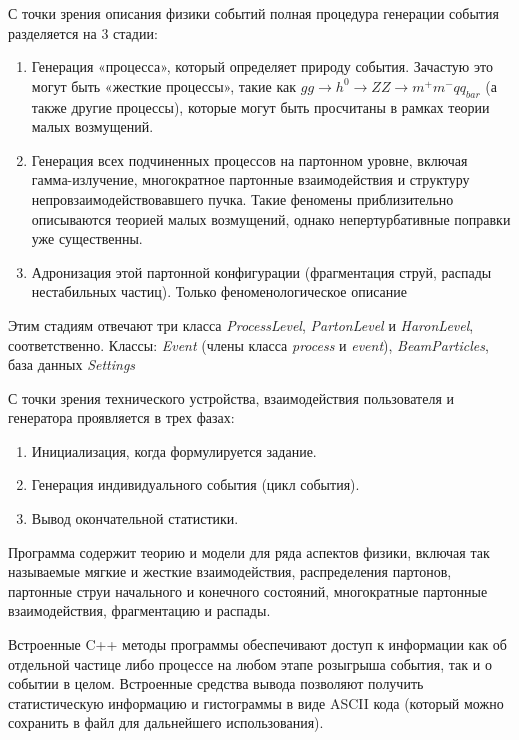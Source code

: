 С точки зрения описания физики событий полная
процедура генерации события разделяется на 3 стадии:

\begin{enumerate}
	\item Генерация «процесса», который определяет природу
	события. Зачастую это могут быть «жесткие процессы»,
	такие как $gg \rightarrow {h}^{0} \rightarrow ZZ \rightarrow {m}^{+}{m}^{-}{qq}_{bar}$ (а также другие
	процессы), которые могут быть просчитаны в рамках
	теории малых возмущений.

	\item Генерация всех подчиненных процессов на партонном
	уровне, включая гамма-излучение, многократное партонные
	взаимодействия и структуру непровзаимодействовавшего
	пучка. Такие феномены приблизительно описываются
	теорией малых возмущений, однако непертурбативные
	поправки уже существенны.
	\item Адронизация этой партонной конфигурации
	(фрагментация струй, распады нестабильных частиц).
	Только феноменологическое описание
\end{enumerate}

Этим стадиям отвечают три класса \textit{ProcessLevel},
\textit{PartonLevel} и \textit{HaronLevel}, соответственно. Классы: \textit{Event}
(члены класса \textit{process} и \textit{event}), \textit{BeamParticles}, база данных
\textit{Settings}

С точки зрения технического устройства,
взаимодействия пользователя и генератора проявляется в
трех фазах:


\begin{enumerate}
	\item Инициализация, когда формулируется задание.
	\item Генерация индивидуального события (цикл события).
	\item Вывод окончательной статистики.
\end{enumerate}

Программа содержит теорию и модели для ряда
аспектов физики, включая так называемые мягкие и жесткие
взаимодействия, распределения партонов, партонные струи
начального и конечного состояний, многократные
партонные взаимодействия, фрагментацию и распады.

Встроенные C++ методы программы обеспечивают
доступ к информации как об отдельной частице либо
процессе на любом этапе розыгрыша события, так и о
событии в целом. Встроенные средства вывода позволяют
получить статистическую информацию и гистограммы в
виде ASCII кода (который можно сохранить в файл для
дальнейшего использования).

